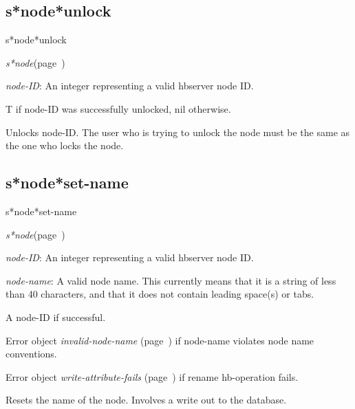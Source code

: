 \subsection{s*node*unlock}
\label{s*node*unlock}

\begin{description}
\item [Name:]  s*node*unlock

\item [Class:] {\sl s*node}\hfill(page~\pageref{s*node})

\item [Parameters:] 
\item {\sl node-ID}:   An integer representing
a valid hbserver node ID.
 

\item [Return-value:]
T if node-ID was successfully unlocked, nil otherwise.

\item [Description:]
Unlocks node-ID. The user who is trying to unlock the node
must be the same as the one who locks the node.

\item [Public:]



\end{description}
\horizontalline

\subsection{s*node*set-name}
\label{s*node*set-name}

\begin{description}
\item [Name:]  s*node*set-name

\item [Class:] {\sl s*node}\hfill(page~\pageref{s*node})

\item [Parameters:]
\item {\sl node-ID}:   An integer representing
a valid hbserver node ID.

\item {\sl node-name}:  
A valid node name. This currently means that it is a
string of less than 40 characters, and that it does
not contain leading space(s) or tabs.


\item [Return-value:]
A node-ID if successful.

Error object {\sl invalid-node-name} (page~\pageref{invalid-node-name}) if node-name
violates node name conventions. 

Error object {\sl write-attribute-fails} (page~\pageref{write-attribute-fails}) if rename
hb-operation fails.

\item [Description:]
Resets the name of the node. Involves a write
out to the database.

\item [Public:]


\end{description}
\horizontalline

